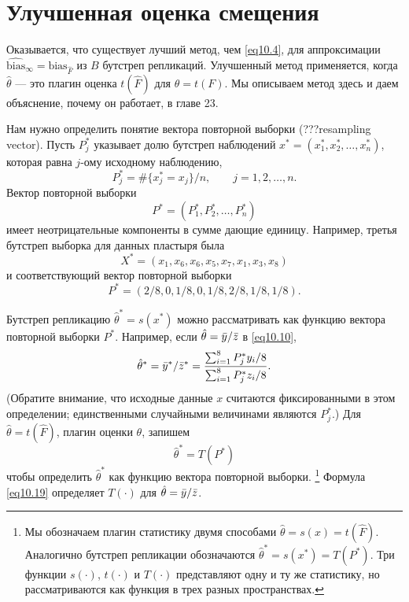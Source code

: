 \section{Улучшенная оценка смещения}

Оказывается, что существует лучший метод, чем \ref{eq10.4}, для аппроксимации $\widehat{\text{bias}}_{\infty} = \text{bias}_{\hat{F}}$ из $B$ бутстреп репликаций. Улучшенный метод применяется, когда $\hat{\theta}$ --- это плагин оценка $t(\hat{F})$ для $\theta = t(F)$. Мы описываем метод здесь и даем объяснение, почему он работает, в главе 23.

Нам нужно определить понятие вектора повторной выборки (???resampling vector). Пусть $P_{j}^{*}$ указывает долю бутстреп наблюдений $x^{*} = (x_{1}^{*}, x_{2}^{*}, \dots, x_{n}^{*})$, которая равна $j$-ому исходному наблюдению,
\begin{equation}
    P_{j}^{*} = \#\{x_{j}^{*} = x_{j}\}/n,\quad\quad j = 1, 2, \dots, n.
\end{equation}
Вектор повторной выборки
\begin{equation}\label{eq10.18}
    P^{*} = (P_{1}^{*}, P_{2}^{*}, \dots, P_{n}^{*})
\end{equation}
имеет неотрицательные компоненты в сумме дающие единицу. Например, третья бутстреп выборка для данных пластыря была $$X^{*} = (x_1, x_6,x_6, x_5, x_7, x_1, x_3, x_8)$$ и соответствующий вектор повторной выборки $$P^* = (2/8, 0, 1/8, 0, 1/8,2/8, 1/8, 1/8).$$

Бутстреп репликацию $\hat{\theta}^{*} = s(x^{*})$ можно рассматривать как функцию вектора повторной выборки $P^{*}$. Например, если $\hat{\theta} = \Bar{y}/\Bar{z}$ в \ref{eq10.10},
\begin{equation}\label{eq10.19}
   \hat{\theta}^{*} = \Bar{y}^{*}/\Bar{z}^{*} = \frac{\sum_{i=1}^{8}P^{*}_{j}y_{i}/8}{\sum_{i=1}^{8}P^{*}_{j}z_{i}/8}.
\end{equation}
(Обратите внимание, что исходные данные $x$ считаются фиксированными в этом определении; единственными случайными величинами являются $P_{j}^{*}$.) Для $\hat{\theta} = t(\hat{F})$, плагин оценки $\theta$, запишем
\begin{equation}\label{eq10.20}
   \hat{\theta}^{*} = T(P^{*})
\end{equation}
чтобы определить $\hat{\theta}^{*}$ как функцию вектора повторной выборки. \footnote{Мы обозначаем плагин статистику двумя способами $\hat{\theta} = s(x) = t(\hat{F})$. Аналогично бутстреп репликации обозначаются $\hat{\theta}^{*} = s(x^{*}) = T(P^{*})$. Три функции $s(\cdot)$, $t(\cdot)$ и $T(\cdot)$ представляют одну и ту же статистику, но рассматриваются как функция в трех разных пространствах.} Формула \ref{eq10.19} определяет $T(\cdot)$ для $\hat{\theta} = \Bar{y}/\Bar{z}$. 


